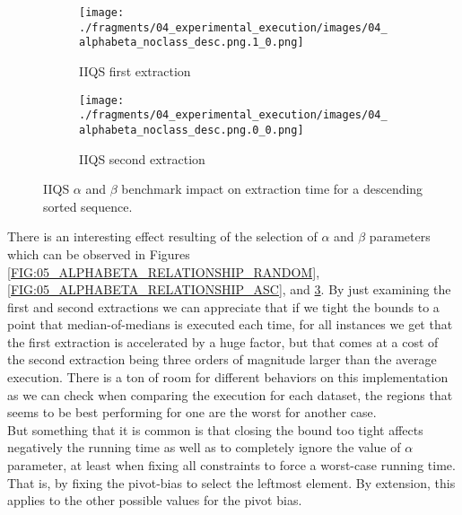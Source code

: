 \begin{figure}
    \centering
    \begin{subfigure}[b]{0.45\textwidth}
        \centering
        \texttt{[image: ./fragments/04\_experimental\_execution/images/04\_alphabeta\_noclass\_desc.png.1\_0.png]}
        \caption{IIQS first extraction}
        \label{FIG:05_ALPHABETA_RELATIONSHIP_DESC__0_0}
    \end{subfigure}
    \hfill
    \begin{subfigure}[b]{0.45\textwidth}
        \centering
        \texttt{[image: ./fragments/04\_experimental\_execution/images/04\_alphabeta\_noclass\_desc.png.0\_0.png]}
        \caption{IIQS second extraction}
        \label{FIG:05_ALPHABETA_RELATIONSHIP_DESC__0_1}
    \end{subfigure}

    \caption{IIQS $\alpha$ and $\beta$ benchmark impact on extraction time for a descending sorted sequence.}
    \label{FIG:05_ALPHABETA_RELATIONSHIP_DESC}
\end{figure}



There is an interesting effect resulting of the selection of $\alpha$ and $\beta$ parameters which can be observed in Figures \ref{FIG:05_ALPHABETA_RELATIONSHIP_RANDOM}, \ref{FIG:05_ALPHABETA_RELATIONSHIP_ASC}, and \ref{FIG:05_ALPHABETA_RELATIONSHIP_DESC}. By just examining the first and second extractions we can appreciate that if we tight the bounds to a point that median-of-medians is executed each time, for all instances we get that the first extraction is accelerated by a huge factor, but that comes at a cost of the second extraction being three orders of magnitude larger than the average execution. There is a ton of room for different behaviors on this implementation as we can check when comparing the execution for each dataset, the regions that seems to be best performing for one are the worst for another case.\\

But something that it is common is that closing the bound too tight affects negatively the running time as well as to completely ignore the value of $\alpha$ parameter, at least when fixing all constraints to force a worst-case running time. That is, by fixing the pivot-bias to select the leftmost element. By extension, this applies to the other possible values for the pivot bias. \\


